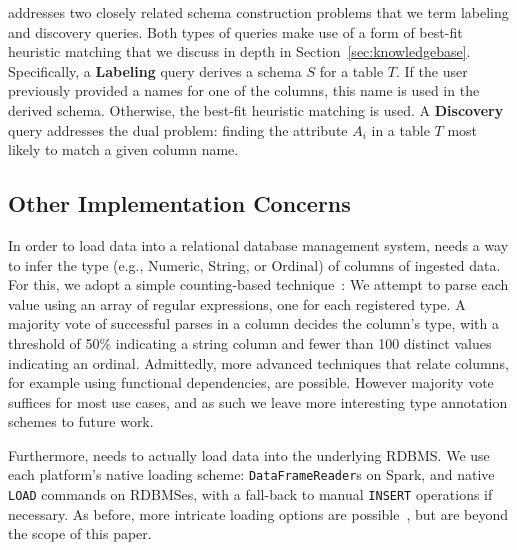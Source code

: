 \systemname addresses two closely related schema construction problems that we term labeling and discovery queries.
Both types of queries make use of a form of best-fit heuristic matching that we discuss in depth in Section~\ref{sec:knowledgebase}.
Specifically, a \textbf{Labeling} query derives a schema $S$ for a table $T$.
If the user previously provided a names for one of the columns, this name is used in the derived schema.
Otherwise, the best-fit heuristic matching is used.
A \textbf{Discovery} query addresses the dual problem: finding the attribute $A_i$ in a table $T$ most likely to match a given column name.

\subsection{Other Implementation Concerns}
In order to load data into a relational database management system, \systemname needs a way to infer the type (e.g., Numeric, String, or Ordinal) of columns of ingested data.  
For this, we adopt a simple counting-based technique~\cite{yang2015lenses}:
We attempt to parse each value using an array of regular expressions, one for each registered type.
A majority vote of successful parses in a column decides the column's type, with a threshold of 50\% indicating a string column and fewer than 100 distinct values indicating an ordinal.
Admittedly, more advanced techniques that relate columns, for example using functional dependencies, are possible.
However majority vote suffices for most use cases, and as such we leave more interesting type annotation schemes to future work.

Furthermore, \systemname needs to actually load data into the underlying RDBMS.  
We use each platform's native loading scheme: \texttt{DataFrameReader}s on Spark, and native \texttt{LOAD} commands on RDBMSes, with a fall-back to manual \texttt{INSERT} operations if necessary.
As before, more intricate loading options are possible~\cite{DBLP:conf/sigmod/AlagiannisBBIA12,DBLP:conf/cidr/IdreosKM07}, but are beyond the scope of this paper.




